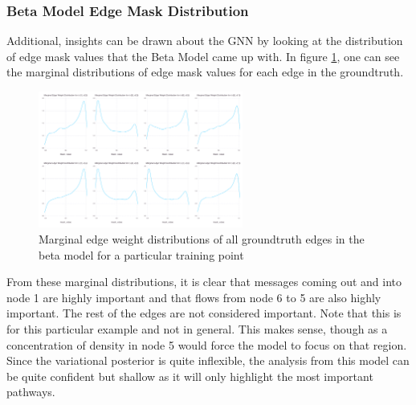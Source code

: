 \subsubsection{Beta Model Edge Mask Distribution}
Additional, insights can be drawn about the GNN by looking at the distribution of edge mask values that the Beta Model came up with. In figure \ref{fig:tree-model-beta-marginal}, one can see the marginal distributions of edge mask values for each edge in the groundtruth. 
\begin{figure}[htb]
	\centering
	\includegraphics[width=0.6\textwidth]{images/tree-model-beta-marginal.pdf}
	\caption{Marginal edge weight distributions of all groundtruth edges in the beta model for a particular training point}
	\label{fig:tree-model-beta-marginal}
\end{figure}
From these marginal distributions, it is clear that messages coming out and into node 1 are highly important and that flows from node 6 to 5 are also highly important. The rest of the edges are not considered important. Note that this is for this particular example and not in general. This makes sense, though as a concentration of density in node 5 would force the model to focus on that region. Since the variational posterior is quite inflexible, the analysis from this model can be quite confident but shallow as it will only highlight the most important pathways.

